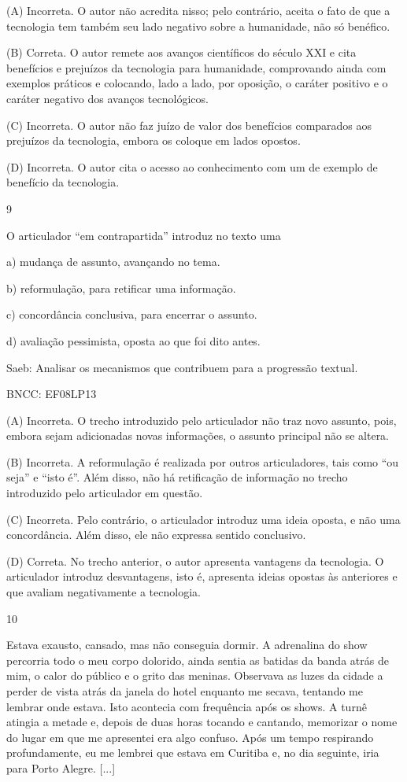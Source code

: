 (A) Incorreta. O autor não acredita nisso; pelo contrário, aceita o fato
de que a tecnologia tem também seu lado negativo sobre a humanidade, não
só benéfico.

(B) Correta. O autor remete aos avanços científicos do século XXI e cita
benefícios e prejuízos da tecnologia para humanidade, comprovando ainda
com exemplos práticos e colocando, lado a lado, por oposição, o caráter
positivo e o caráter negativo dos avanços tecnológicos.

(C) Incorreta. O autor não faz juízo de valor dos benefícios comparados
aos prejuízos da tecnologia, embora os coloque em lados opostos.

(D) Incorreta. O autor cita o acesso ao conhecimento com um de exemplo
de benefício da tecnologia.

\num{9}

O articulador ``em contrapartida'' introduz no texto uma

a) mudança de assunto, avançando no tema.

b) reformulação, para retificar uma informação.

c) concordância conclusiva, para encerrar o assunto.

d) avaliação pessimista, oposta ao que foi dito antes.

Saeb: Analisar os mecanismos que contribuem para a progressão textual.

BNCC: EF08LP13

(A) Incorreta. O trecho introduzido pelo articulador não traz novo
assunto, pois, embora sejam adicionadas novas informações, o assunto
principal não se altera.

(B) Incorreta. A reformulação é realizada por outros articuladores, tais
como ``ou seja'' e ``isto é''. Além disso, não há retificação de
informação no trecho introduzido pelo articulador em questão.

(C) Incorreta. Pelo contrário, o articulador introduz uma ideia oposta,
e não uma concordância. Além disso, ele não expressa sentido conclusivo.

(D) Correta. No trecho anterior, o autor apresenta vantagens da
tecnologia. O articulador introduz desvantagens, isto é, apresenta
ideias opostas às anteriores e que avaliam negativamente a tecnologia.

\num{10}

Estava exausto, cansado, mas não conseguia dormir. A adrenalina do show
percorria todo o meu corpo dolorido, ainda sentia as batidas da banda
atrás de mim, o calor do público e o grito das meninas. Observava as
luzes da cidade a perder de vista atrás da janela do hotel enquanto me
secava, tentando me lembrar onde estava. Isto acontecia com frequência
após os shows. A turnê atingia a metade e, depois de duas horas tocando
e cantando, memorizar o nome do lugar em que me apresentei era algo
confuso. Após um tempo respirando profundamente, eu me lembrei que
estava em Curitiba e, no dia seguinte, iria para Porto Alegre. {[}...{]}

